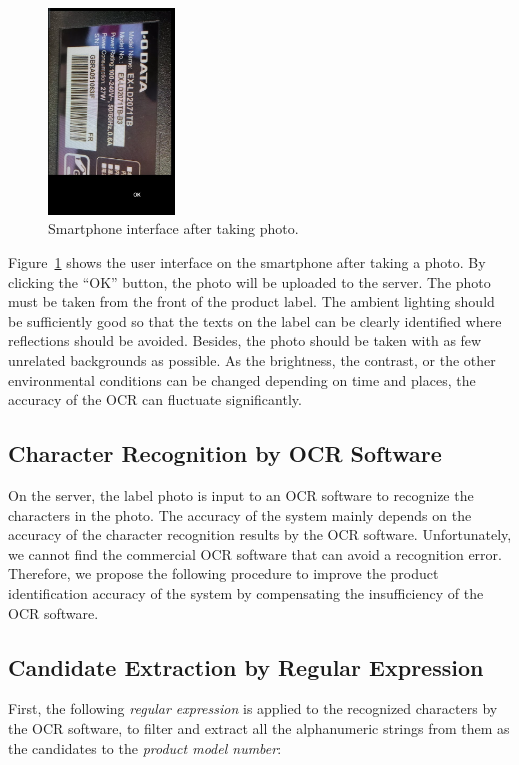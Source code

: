 \documentclass[technicalreport]{ieicej}
\begin{document}
        \begin{figure}[t] 
            \begin{center}
            \includegraphics[width=0.30\textwidth]{figure/camera.png}
            \end{center}
            \caption{Smartphone interface after taking photo.}
            \label{fig:camera}
        \end{figure}

        Figure~\ref{fig:camera} shows the user interface on the smartphone after taking a photo. By clicking the “OK” button, the photo will be uploaded to the server. The photo must be taken from the front of the product label. The ambient lighting should be sufficiently good so that the texts on the label can be clearly identified where reflections should be avoided. Besides, the photo should be taken with as few unrelated backgrounds as possible. As the brightness, the contrast, or the other environmental conditions can be changed depending on time and places, the accuracy of the OCR can fluctuate significantly. 

    \subsection{Character Recognition by OCR Software}
        On the server, the label photo is input to an OCR software to recognize the characters in the photo. The accuracy of the system mainly depends on the accuracy of the character recognition results by the OCR software. Unfortunately, we cannot find the commercial OCR software that can avoid a recognition error. Therefore, we propose the following procedure to improve the product identification accuracy of the system by compensating the insufficiency of the OCR software.

    \subsection{Candidate Extraction by Regular Expression}
    \label{sec:regex}
        First, the following {\em regular expression} is applied to the recognized characters by the OCR software, to filter and extract all the alphanumeric strings from them as the candidates to the {\em product model number}:
\end{document}
